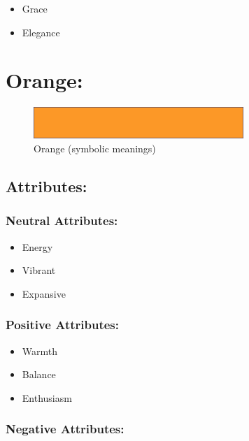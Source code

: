\documentclass[openleft,oneside,showtrims]{memoir}
\begin{document}
\begin{itemize}
\item Grace
\item Elegance
\end{itemize}

\section{Orange:}
\label{sec:org39fb73e}

\begin{figure}[htbp]
\centering
\includegraphics[width=300px]{./media/orange-banner.png}
\caption{\label{fig:HAP-WR-010}Orange (symbolic meanings)}
\end{figure}

\subsection{Attributes:}
\label{sec:orga2c3aea}

\subsubsection*{Neutral Attributes:}
\label{sec:org6f9ede6}

\begin{itemize}
\item Energy
\item Vibrant
\item Expansive
\end{itemize}

\subsubsection*{Positive Attributes:}
\label{sec:orged1557e}

\begin{itemize}
\item Warmth
\item Balance
\item Enthusiasm
\end{itemize}

\subsubsection*{Negative Attributes:}
\label{sec:org3094cf4}
\end{document}
